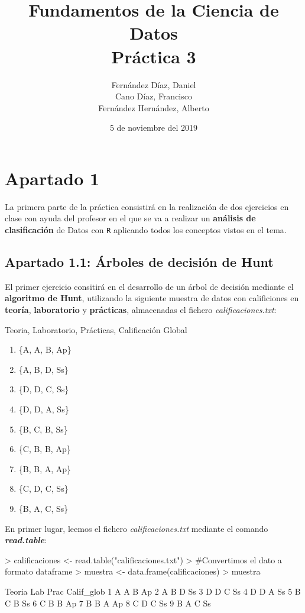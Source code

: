\documentclass [a4paper] {article}
\title{\textbf{Fundamentos de la Ciencia de Datos\\Práctica 3}}
\author{
	Fernández Díaz, Daniel\\
	Cano Díaz, Francisco\\
	Fernández Hernández, Alberto\\
}
\date{5 de noviembre del 2019}
\begin{document}

\maketitle
\newpage
\tableofcontents
\newpage

\section{Apartado 1}
La primera parte de la práctica consistirá en la realización de dos ejercicios en clase con ayuda del profesor en el que se va a
realizar un \textbf{análisis de clasificación} de Datos con \texttt{R} aplicando todos los conceptos vistos en el tema.
\subsection{Apartado 1.1: Árboles de decisión de Hunt}
El primer ejercicio consitirá en el desarrollo de un árbol de decisión mediante el \textbf{algoritmo de Hunt}, utilizando la siguiente 
muestra de datos con calificiones en \textbf{teoría}, \textbf{laboratorio} y \textbf{prácticas}, almacenadas el fichero \textit{calificaciones.txt}:
\begin{center}
  {Teoria, Laboratorio, Prácticas, Calificación Global}
  \begin{enumerate}
    \centering
    \item \{A, A, B, Ap\}
    \item \{A, B, D, Ss\}
    \item \{D, D, C, Ss\}
    \item \{D, D, A, Ss\}
    \item \{B, C, B, Ss\}
    \item \{C, B, B, Ap\}
    \item \{B, B, A, Ap\}
    \item \{C, D, C, Ss\}
    \item \{B, A, C, Ss\}
  \end{enumerate}
\end{center}
En primer lugar, leemos el fichero \textit{calificaciones.txt} mediante el comando \textbf{\textit{read.table}}:
\begin{Schunk}
\begin{Sinput}
> calificaciones <- read.table("calificaciones.txt")
> #Convertimos el dato a formato dataframe
> muestra <- data.frame(calificaciones)
> muestra
\end{Sinput}
\begin{Soutput}
  Teoria Lab Prac Calif_glob
1      A   A    B         Ap
2      A   B    D         Ss
3      D   D    C         Ss
4      D   D    A         Ss
5      B   C    B         Ss
6      C   B    B         Ap
7      B   B    A         Ap
8      C   D    C         Ss
9      B   A    C         Ss
\end{Soutput}
\end{Schunk}
\end{document}
